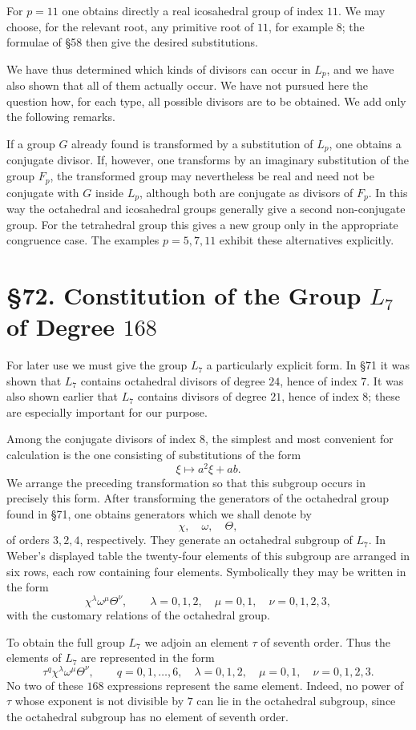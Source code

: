 \documentclass[11pt,a4paper]{book}
\newcommand{\webersection}[2]{\clearpage\section*{\S #1. #2}}
\begin{document}
For \(p=11\) one obtains directly a real icosahedral group of index \(11\).  We may choose, for the relevant root, any primitive root of \(11\), for example \(8\); the formulae of \S 58 then give the desired substitutions.

We have thus determined which kinds of divisors can occur in \(L_p\), and we have also shown that all of them actually occur.  We have not pursued here the question how, for each type, all possible divisors are to be obtained.  We add only the following remarks.

If a group \(G\) already found is transformed by a substitution of \(L_p\), one obtains a conjugate divisor.  If, however, one transforms by an imaginary substitution of the group \(F_p\), the transformed group may nevertheless be real and need not be conjugate with \(G\) inside \(L_p\), although both are conjugate as divisors of \(F_p\).  In this way the octahedral and icosahedral groups generally give a second non-conjugate group.  For the tetrahedral group this gives a new group only in the appropriate congruence case.  The examples \(p=5,7,11\) exhibit these alternatives explicitly.

\webersection{72}{Constitution of the Group \(L_7\) of Degree \(168\)}

For later use we must give the group \(L_7\) a particularly explicit form.  In \S 71 it was shown that \(L_7\) contains octahedral divisors of degree \(24\), hence of index \(7\).  It was also shown earlier that \(L_7\) contains divisors of degree \(21\), hence of index \(8\); these are especially important for our purpose.

Among the conjugate divisors of index \(8\), the simplest and most convenient for calculation is the one consisting of substitutions of the form
\[
 \xi\longmapsto a^2\xi+ab .
\]
We arrange the preceding transformation so that this subgroup occurs in precisely this form.  After transforming the generators of the octahedral group found in \S 71, one obtains generators which we shall denote by
\[
 \chi,\quad \omega,\quad \Theta,
\]
of orders \(3,2,4\), respectively.  They generate an octahedral subgroup of \(L_7\).  In Weber's displayed table the twenty-four elements of this subgroup are arranged in six rows, each row containing four elements.  Symbolically they may be written in the form
\[
 \chi^\lambda \omega^\mu \Theta^\nu,\qquad
 \lambda=0,1,2,\quad \mu=0,1,\quad \nu=0,1,2,3,
\]
with the customary relations of the octahedral group.

To obtain the full group \(L_7\) we adjoin an element \(\tau\) of seventh order.  Thus the elements of \(L_7\) are represented in the form
\[
 \tau^q\chi^\lambda\omega^\mu\Theta^\nu,
 \qquad
 q=0,1,\ldots,6,\quad
 \lambda=0,1,2,\quad
 \mu=0,1,\quad
 \nu=0,1,2,3.
\]
No two of these \(168\) expressions represent the same element.  Indeed, no power of \(\tau\) whose exponent is not divisible by \(7\) can lie in the octahedral subgroup, since the octahedral subgroup has no element of seventh order.
\end{document}
